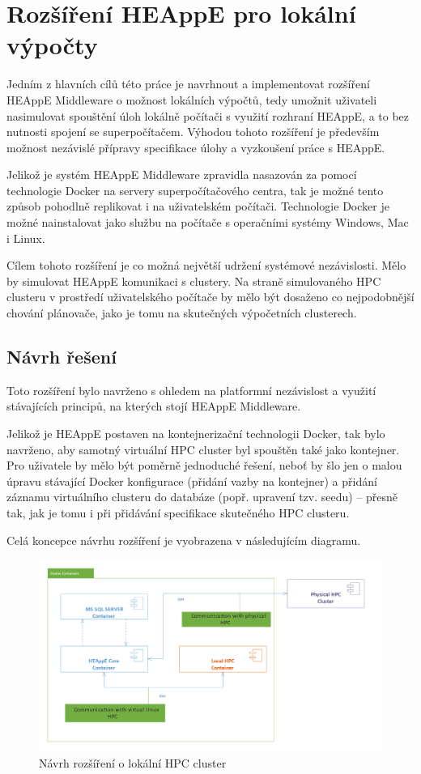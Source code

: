 \chapter{Rozšíření HEAppE pro lokální výpočty}
Jedním z hlavních cílů této práce je navrhnout a implementovat rozšíření HEAppE Middleware o možnost lokálních výpočtů, tedy umožnit uživateli nasimulovat spouštění úloh lokálně počítači s využití rozhraní HEAppE, a to bez nutnosti spojení se superpočítačem. Výhodou tohoto rozšíření je především možnost nezávislé přípravy specifikace úlohy a vyzkoušení práce s HEAppE.

Jelikož je systém HEAppE Middleware zpravidla nasazován za pomocí technologie Docker na servery superpočítačového centra, tak je možné tento způsob pohodlně replikovat i na uživatelském počítači. Technologie Docker je možné nainstalovat jako službu na počítače s operačními systémy Windows, Mac i Linux.

Cílem tohoto rozšíření je co možná největší udržení systémové nezávislosti. Mělo by simulovat HEAppE komunikaci s clustery. Na straně simulovaného HPC clusteru v prostředí uživatelského počítače by mělo být dosaženo co nejpodobnější chování plánovače, jako je tomu na skutečných výpočetních clusterech.

\section{Návrh řešení}
Toto rozšíření bylo navrženo s ohledem na platformní nezávislost a využití stávajících principů, na kterých stojí HEAppE Middleware.

Jelikož je HEAppE postaven na kontejnerizační technologii Docker, tak bylo navrženo, aby samotný virtuální HPC cluster byl spouštěn také jako kontejner. Pro uživatele by mělo být poměrně jednoduché řešení, neboť by šlo jen o malou úpravu stávající Docker konfigurace (přidání vazby na kontejner) a přidání záznamu virtuálního clusteru do databáze (popř. upravení tzv. seedu) – přesně tak, jak je tomu i při přidávání specifikace skutečného HPC clusteru.

Celá koncepce návrhu rozšíření je vyobrazena v následujícím diagramu.

\newpage
\begin{figure}
	\centering
	\includegraphics[width=1.0\textwidth]{Figures/local-hpc-clsuter-navrh.png}
	\caption{Návrh rozšíření o lokální HPC cluster}
	\label{fig:navrh-rozsireni-o-lokalni-hpc-clsuter}
\end{figure}

